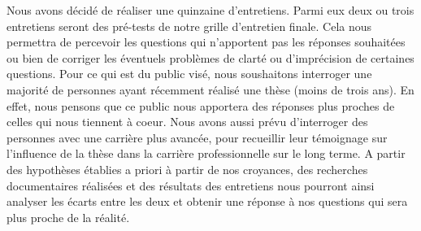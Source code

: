 \documentclass[12pt]{article}
\begin{document}
Nous avons décidé de réaliser une quinzaine d'entretiens. Parmi eux deux ou trois entretiens seront des pré-tests de notre grille d'entretien finale. Cela nous permettra de percevoir les questions qui n'apportent pas les réponses souhaitées ou bien de corriger les éventuels problèmes de clarté ou d'imprécision de certaines questions. Pour ce qui est du public visé, nous soushaitons interroger une majorité de personnes ayant récemment réalisé une thèse (moins de trois ans). En effet, nous pensons que ce public nous apportera des réponses plus proches de celles qui nous tiennent à coeur. Nous avons aussi prévu d'interroger des personnes avec une carrière plus avancée, pour recueillir leur témoignage sur l'influence de la thèse dans la carrière professionnelle sur le long terme. A partir des hypothèses établies a priori à partir de nos croyances, des recherches documentaires réalisées et des résultats des entretiens nous pourront ainsi analyser les écarts entre les deux et obtenir une réponse à nos questions qui sera plus proche de la réalité.
\end{document}
